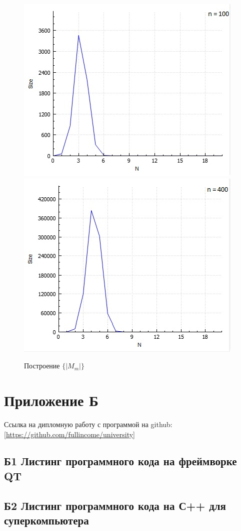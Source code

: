 \begin{figure}[th]
    \centering
    \includegraphics[]{1.jpg}
    \includegraphics[]{2.jpg}
    \caption{Построение $\{ |M_m|\} $}
    \label{program_example}
\end{figure}


\section*{Приложение Б}
\label{sec:Apendix_2} 
\large

Ссылка на дипломную работу с программой на github: \ref{https://github.com/fullincome/university}

\subsection*{Б1 Листинг программного кода на фреймворке QT}

\subsection*{Б2 Листинг программного кода на С++ для суперкомпьютера}
